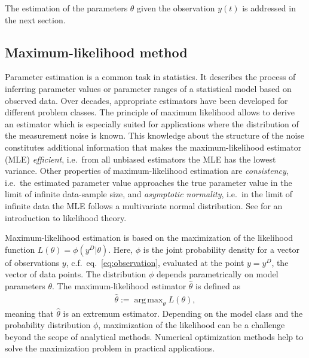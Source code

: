 \documentclass[article]{jss}
\DeclareMathOperator*{\argmax}{arg\,max}
\begin{document}
The estimation of the parameters $\theta$ given the observation $y(t)$ is addressed in the next section.



\subsection{Maximum-likelihood method}

Parameter estimation is a common task in statistics. It describes the process of inferring parameter values or parameter ranges of a statistical model based on observed data. Over decades, appropriate estimators have been developed for different problem classes. The principle of maximum likelihood allows to derive an estimator which is especially suited for applications where the distribution of the measurement noise is known. This knowledge about the structure of the noise constitutes additional information that makes the maximum-likelihood estimator (MLE) \textit{efficient}, i.e.~from all unbiased estimators the MLE has the lowest variance. Other properties of maximum-likelihood estimation are \textit{consistency}, i.e.~the estimated parameter value approaches the true parameter value in the limit of infinite data-sample size, and \textit{asymptotic normality}, i.e.~in the limit of infinite data the MLE follows a multivariate normal distribution. See \cite{azzalini1996statistical} for an introduction to likelihood theory.

Maximum-likelihood estimation is based on the maximization of the likelihood function $L(\theta) = \phi(y^D|\theta)$. Here, $\phi$ is the joint probability density for a vector of observations $y$, c.f.~eq.~\eqref{eq:observation}, evaluated at the point $y = y^D$, the vector of data points. The distribution $\phi$ depends parametrically on model parameters $\theta$. The maximum-likelihood estimator $\hat\theta$ is defined as
\begin{align*}
	\hat \theta := \argmax_{\theta} L(\theta),
\end{align*}
meaning that $\hat\theta$ is an extremum estimator. Depending on the model class and the probability distribution $\phi$, maximization of the likelihood can be a challenge beyond the scope of analytical methods. Numerical optimization methods help to solve the maximization problem in practical applications.
\end{document}
